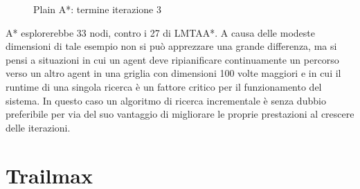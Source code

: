 \documentclass[11pt]{book}
\begin{document}
\begin{figure}[H]
\caption[caption]{Plain A*: termine iterazione 3} \label{fig:A3}
\end{figure}

\par A* esplorerebbe 33 nodi, contro i 27 di LMTAA*. A causa delle modeste dimensioni di tale esempio non si pu\`o apprezzare una grande differenza, ma si pensi a situazioni in cui un agent deve ripianificare continuamente un percorso verso un altro agent in una griglia con dimensioni 100 volte maggiori e in cui il runtime di una singola ricerca \`e un fattore critico per il funzionamento del sistema. In questo caso un algoritmo di ricerca incrementale \`e senza dubbio preferibile per via del suo vantaggio di migliorare le proprie prestazioni al crescere delle iterazioni.
\section{Trailmax}
\label{sec:trailmax}
\end{document}
